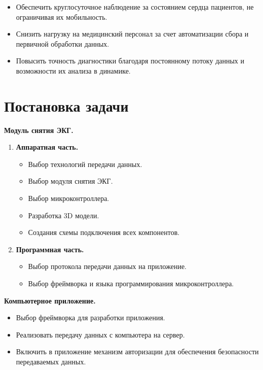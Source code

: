 \documentclass[12pt, russian]{extarticle}
\begin{document}
\begin{spacing}{1.5}
\begin{itemize}
\item Обеспечить круглосуточное наблюдение за состоянием сердца пациентов, не ограничивая их мобильность.
\item Снизить нагрузку на медицинский персонал за счет автоматизации сбора и первичной обработки данных.
\item Повысить точность диагностики благодаря постоянному потоку данных и возможности их анализа в динамике.
\end{itemize}

\newpage
\section{Постановка задачи}

\noindent \textbf{Модуль снятия ЭКГ.}

\begin{enumerate}

    \item \textbf{Аппаратная часть.}
    \begin{itemize}
        \item Выбор технологий передачи данных.
        \item Выбор модуля снятия ЭКГ.
        \item Выбор микроконтроллера.
        \item Разработка 3D модели.
        \item Создания схемы подключения всех компонентов.
    \end{itemize}

    \item \textbf{Программная часть.}
    \begin{itemize}
        \item Выбор протокола передачи данных на приложение.
        \item Выбор фреймворка и языка программирования микроконтроллера.
    \end{itemize}

\end{enumerate}

\noindent \textbf{Компьютерное приложение.}

\begin{itemize}
    \item Выбор фреймворка для разработки приложения.
    \item Реализовать передачу данных с компьютера на сервер.
    \item Включить в приложение механизм авторизации для обеспечения безопасности передаваемых данных.
\end{itemize}


\end{spacing}
\end{document}
